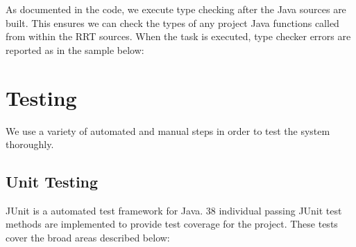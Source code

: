 \documentclass[a4paper,openany,12pt]{book}
\begin{document}
As documented in the code, we execute type checking after the Java sources are built.
This ensures we can check the types of any project Java functions called from within the RRT sources.
When the task is executed, type checker errors are reported as in the sample below:


\chapter{Testing}

We use a variety of automated and manual steps in order to test the system thoroughly.

\section{Unit Testing}

JUnit is a automated test framework for Java.
38 individual passing JUnit test methods are implemented to provide test coverage for the project.
These tests cover the broad areas described below:
\end{document}
